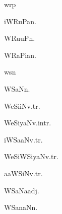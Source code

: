 \begin{multicols*}{2}
\begin{dictroot}{wr}{p}
    \begin{dictentry}{iWRuPa}{n.}
    \end{dictentry}
    \begin{dictentry}{WRuuP}{n.}
    \end{dictentry}
    \begin{dictentry}{WRaPia}{n.}
    \end{dictentry}
\end{dictroot}

\begin{dictroot}{ws}{n}
    \begin{dictentry}{WSaN}{n.}
    \end{dictentry}
    \begin{dictentry}{WeSiiN}{v.tr.}
    \end{dictentry}
    \begin{dictentry}{WeSiyaN}{v.intr.}
    \end{dictentry}
    \begin{dictentry}{iWSaaN}{v.tr.}
    \end{dictentry}
    \begin{dictentry}{WeSiWSiyaN}{v.tr.}
    \end{dictentry}
    \begin{dictentry}{aaWSiN}{v.tr.}
    \end{dictentry}
    \begin{dictentry}{WSaNa}{adj.}
    \end{dictentry}
    \begin{dictentry}{WSanaN}{n.}
    \end{dictentry}

\end{dictroot}
\end{multicols*}
